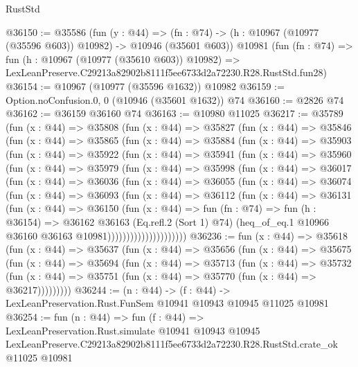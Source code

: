 \begin{lexlean}{RustStd}
\begin{coremodule}
@36150 := @35586
    (fun (y : @44) =>
    (fn : @74) -> (h : @10967 (@10977 (@35596 @603)) @10982) -> @10946 (@35601 @603))
    @10981
    (fun (fn : @74) =>
    fun (h : @10967 (@10977 (@35610 @603)) @10982) =>
    LexLeanPreserve.C29213a82902b8111f5ee6733d2a72230.R28.RustStd.fun28)
@36154 := @10967 (@10977 (@35596 @1632)) @10982
@36159 := Option.noConfusion.{0, 0} (@10946 (@35601 @1632)) @74
@36160 := @2826 @74
@36162 := @36159 @36160 @74
@36163 := @10980 @11025
@36217 := @35789
    (fun (x : @44) =>
    @35808
      (fun (x : @44) =>
      @35827
        (fun (x : @44) =>
        @35846
          (fun (x : @44) =>
          @35865
            (fun (x : @44) =>
            @35884
              (fun (x : @44) =>
              @35903
                (fun (x : @44) =>
                @35922
                  (fun (x : @44) =>
                  @35941
                    (fun (x : @44) =>
                    @35960
                      (fun (x : @44) =>
                      @35979
                        (fun (x : @44) =>
                        @35998
                          (fun (x : @44) =>
                          @36017
                            (fun (x : @44) =>
                            @36036
                              (fun (x : @44) =>
                              @36055
                                (fun (x : @44) =>
                                @36074
                                  (fun (x : @44) =>
                                  @36093
                                    (fun (x : @44) =>
                                    @36112
                                      (fun (x : @44) =>
                                      @36131
                                        (fun (x : @44) =>
                                        @36150
                                          (fun (x : @44) =>
                                          fun (fn : @74) =>
                                          fun (h : @36154) =>
                                          @36162
                                            @36163
                                            (Eq.refl.{2} (Sort 1) @74)
                                            (heq_of_eq.{1}
                                              @10966
                                              @36160
                                              @36163
                                              @10981)))))))))))))))))))))
@36236 := fun (x : @44) =>
  @35618
    (fun (x : @44) =>
    @35637
      (fun (x : @44) =>
      @35656
        (fun (x : @44) =>
        @35675
          (fun (x : @44) =>
          @35694
            (fun (x : @44) =>
            @35713
              (fun (x : @44) =>
              @35732
                (fun (x : @44) => @35751 (fun (x : @44) => @35770 (fun (x : @44) => @36217)))))))))
@36244 := (n : @44) ->
  (f : @44) -> LexLeanPreservation.Rust.FunSem @10941 @10943 @10945 @11025 @10981
@36254 := fun (n : @44) =>
  fun (f : @44) =>
  LexLeanPreservation.Rust.simulate
    @10941
    @10943
    @10945
    LexLeanPreserve.C29213a82902b8111f5ee6733d2a72230.R28.RustStd.crate_ok
    @11025
    @10981
\end{coremodule}
\end{lexlean}
